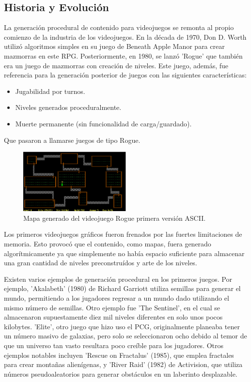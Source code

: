     \subsection{Historia y Evolución}
    La generación procedural de contenido para videojuegos se remonta al propio comienzo de la industria de los videojuegos. En la década de 1970, Don D. Worth utilizó algoritmos simples en su juego de Beneath Apple Manor para crear mazmorras en este RPG. Posteriormente, en 1980, se lanzó 'Rogue' que también era un juego de mazmorras con creación de niveles. Este juego, además, fue referencia para la generación posterior de juegos con las siguientes características:
    \begin{itemize}
        \item Jugabilidad por turnos.
        \item Niveles generados proceduralmente.
        \item Muerte permanente (sin funcionalidad de carga/guardado).
    \end{itemize}

    Que pasaron a llamarse juegos de tipo Rogue. \cite{ProceduralContentCreation}

   
    \begin{figure}[h]
        \centering
        \includegraphics[width=0.5\textwidth]{img/Rogue.png}
        \caption{Mapa generado del videojuego Rogue primera versión ASCII.}
        \label{fig:1.0}
    \end{figure}
        
    

    Los primeros videojuegos gráficos fueron frenados por las fuertes limitaciones de memoria. Esto provocó que el contenido, como mapas, fuera generado algorítmicamente ya que simplemente no había espacio suficiente para almacenar una gran cantidad de niveles preconstruídos y arte de los niveles.
    
    Existen varios ejemplos de generación procedural en los primeros juegos. Por ejemplo, 'Akalabeth' (1980) de Richard Garriott utiliza semillas para generar el mundo, permitiendo a los jugadores regresar a un mundo dado utilizando el mismo número de semillas. Otro ejemplo fue 'The Sentinel', en el cual se almacenaron supuestamente diez mil niveles diferentes en solo unos pocos kilobytes. 'Elite', otro juego que hizo uso el PCG, originalmente planeaba tener un número masivo de galaxias, pero solo se seleccionaron ocho debido al temor de que un universo tan vasto resultara poco creíble para los jugadores. Otros ejemplos notables incluyen 'Rescue on Fractalus' (1985), que emplea fractales para crear montañas alienígenas, y 'River Raid' (1982) de Activision, que utiliza números pseudoaleatorios para generar obstáculos en un laberinto desplazable. \cite{generacion-procedimental-wikipedia}

